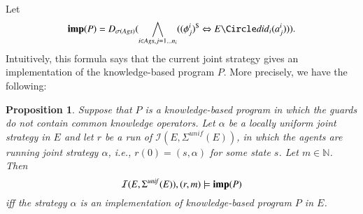 \documentclass[a4wide]{article}
\newcommand{\nat}{\mathbb{N}}
\newcommand{\dimp}{\Leftrightarrow}
\newtheorem{propn}{Proposition}
\theoremstyle{examplesty}
\newcommand{\strat}{\sigma}
\newcommand{\Ags}{\mathit{Ags}}
\newcommand{\I}{\mathcal{I}}
\newcommand{\Env}{E}
\newcommand{\nxt}{\Circle}
\newcommand{\sgy}{\alpha}
\newcommand{\unif}{\mathit{unif}}
\newcommand{\Strat}{\Sigma}
\begin{document}
Let  $${\bf imp}(P) = D_{\strat(\Ags)} ( \bigwedge_{i \in \Ags, j =1 \ldots n_i} ((\phi^i_j)^\$ \dimp 
E\nxt
\did_i(a^i_j))).$$
Intuitively, this  formula says that the current joint strategy gives an implementation of the knowledge-based program $P$. 
More precisely, we have the following: 

\begin{propn} \label{prop:kbp}
Suppose that $P$ is a knowledge-based program
in which the guards do not contain common knowledge operators. 
Let $\sgy$ be a locally uniform joint strategy in $\Env$ and let $r$ 
be a run of 
$\I(E,\Strat^\unif(E))$, 
in which the agents are running 
joint 
strategy $\sgy$, i.e., 
$r(0) = (s, \alpha)$ for some state $s$. 
Let $m\in \nat$.
Then 
$$\I(E,\Strat^\unif(E)), (r,m) \models {\bf imp}(P)$$
iff the strategy $\sgy$ is an implementation of knowledge-based program $P$ in $\Env$. 
\end{propn} 
\end{document}
